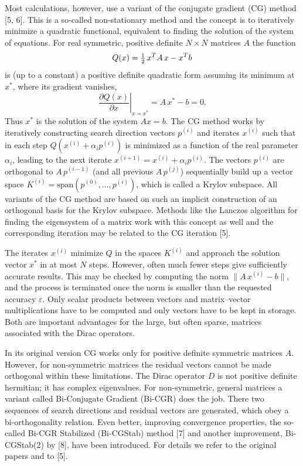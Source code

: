 Most calculations, however, use a variant of the conjugate gradient (CG) method
[5, 6]. This is a so-called non-stationary method and the concept is to
iteratively minimize a quadratic functional, equivalent to finding the solution
of the system of equations. For real symmetric, positive definite $N\times N$
matrices $A$ the function
\begin{equation}
  Q(x) = \tfrac{1}{2}\, x^T A\, x - x^T b
\end{equation}
is (up to a constant) a positive definite quadratic form assuming its minimum
at $x^*$, where its gradient vanishes,
\begin{equation}
  \left.\frac{\partial Q(x)}{\partial x}\right|_{x = x^*}
  = A\, x^* - b = 0 .
\end{equation}
Thus $x^*$ is the solution of the system $Ax = b$. The CG method works by
iteratively constructing search direction vectors $p^{(i)}$ and iterates
$x^{(i)}$ such that in each step $Q(x^{(i)} + \alpha_i p^{(i)})$ is minimized as
a function of the real parameter $\alpha_i$, leading to the next iterate
$x^{(i+1)} = x^{(i)} + \alpha_i p^{(i)}$. The vectors $p^{(i)}$ are orthogonal
to $A\,p^{(i-1)}$ (and all previous $A\,p^{(j)}$) sequentially build up a
vector space $K^{(i)} = \mathrm{span}(p^{(0)}, \ldots, p^{(i)})$, which is
called a Krylov subspace. All variants of the CG method are based on such an
implicit construction of an orthogonal basis for the Krylov subspace. Methods
like the Lanczos algorithm for finding the eigensystem of a matrix work with
this concept as well and the corresponding iteration may be related to the CG
iteration [5].

The iterates $x^{(i)}$ minimize $Q$ in the spaces $K^{(i)}$ and approach the
solution vector $x^*$ in at most $N$ steps. However, often much fewer steps
give sufficiently accurate results. This may be checked by computing the norm
$\|A\,x^{(i)} - b\|$, and the process is terminated once the norm is smaller
than the requested accuracy $\varepsilon$. Only scalar products between vectors
and matrix--vector multiplications have to be computed and only vectors have to
be kept in storage. Both are important advantages for the large, but often
sparse, matrices associated with the Dirac operators.

In its original version CG works only for positive definite symmetric matrices
$A$. However, for non-symmetric matrices the residual vectors cannot be made
orthogonal within these limitations. The Dirac operator $D$ is not positive
definite hermitian; it has complex eigenvalues. For non-symmetric, general
matrices a variant called Bi-Conjugate Gradient (Bi-CGR) does the job. There
two sequences of search directions and residual vectors are generated, which
obey a bi-orthogonality relation. Even better, improving convergence
properties, the so-called Bi-CGR Stabilized (Bi-CGStab) method [7] and another
improvement, Bi-CGStab(2) by [8], have been introduced. For details we refer to
the original papers and to [5].

